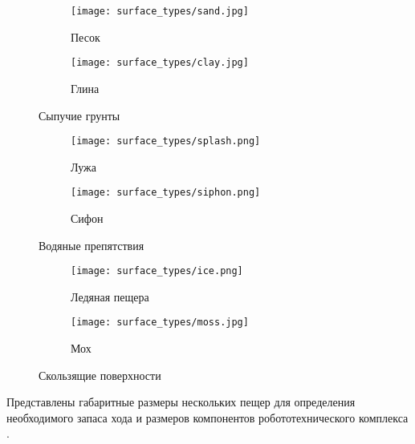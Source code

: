 \begin{figure}[H]
\begin{subfigure}{0.49\textwidth}
\texttt{[image: surface\_types/sand.jpg]}\\
\caption{Песок}
\label{fig:sand}
\end{subfigure}
\begin{subfigure}{0.49\textwidth}
\texttt{[image: surface\_types/clay.jpg]}\\
\caption{Глина}
\label{fig:clay}
\end{subfigure}
\caption{Сыпучие грунты}
\label{fig:running_soils}
\end{figure}

\begin{figure}[H]
\begin{subfigure}{0.49\textwidth}
\texttt{[image: surface\_types/splash.png]}\\
\caption{Лужа}
\label{fig:splash}
\end{subfigure}
\begin{subfigure}{0.49\textwidth}
\texttt{[image: surface\_types/siphon.png]}\\
\caption{Сифон}
\label{fig:siphon}
\end{subfigure}
\caption{Водяные препятствия}
\label{fig:water_obstacles}
\end{figure}

\begin{figure}[H]
\begin{subfigure}{0.49\textwidth}
\centering\texttt{[image: surface\_types/ice.png]}\\
\caption{Ледяная пещера}
\label{fig:icee}
\end{subfigure}
\begin{subfigure}{0.49\textwidth}
\centering\texttt{[image: surface\_types/moss.jpg]}\\
\caption{Мох}
\label{fig:moss}
\end{subfigure}
\caption{Скользящие поверхности}
\label{fig:slippery_surfaces}
\end{figure}

Представлены габаритные размеры нескольких пещер для определения необходимого запаса хода и размеров компонентов робототехнического комплекса \cite{1960,1963,1969,1971}.

